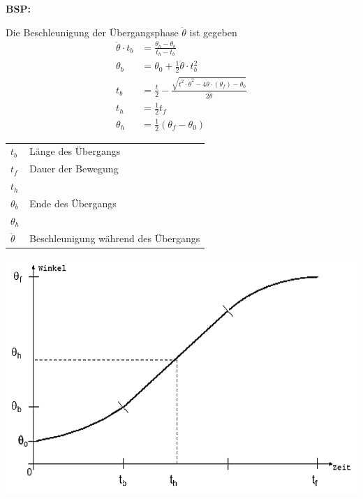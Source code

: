 \begin{minipage}{0.5\linewidth}
    \textbf{BSP:}\newline
    {\small 
    Die Beschleunigung der Übergangsphase $\ddot{\theta}$ ist gegeben\newline
    \begin{align*}
        \ddot{\theta}\cdot t_b &= \frac{\theta_h-\theta_b}{t_h - t_b}\\
        \theta_b &=\theta_0 + \frac{1}{2}\ddot{\theta}\cdot t_b^2\\
        t_b &= \frac{t}{2}- \frac{\sqrt{t^2\cdot \ddot{\theta}^2-4\ddot{\theta}\cdot(\theta_f)- \theta_0}}{2\ddot{\theta}}\\
        t_h &= \frac{1}{2}t_f\\
        \theta_h &=\frac{1}{2}(\theta_f -\theta_0)
    \end{align*}
    \begin{tabular}{ll}
        $t_b$ & Länge des Übergangs\\
        $t_f$ & Dauer der Bewegung\\
        $t_h$ & \\
        $\theta_b$& Ende des Übergangs\\
        $\theta_h$& \\
        $\ddot{\theta}$& Beschleunigung während des Übergangs\\
    \end{tabular}}
\end{minipage}
\begin{minipage}{0.5\linewidth}
    \includegraphics[width=0.9\linewidth]{./bilder/RampenprofilInterpol}
\end{minipage}
\clearpage
